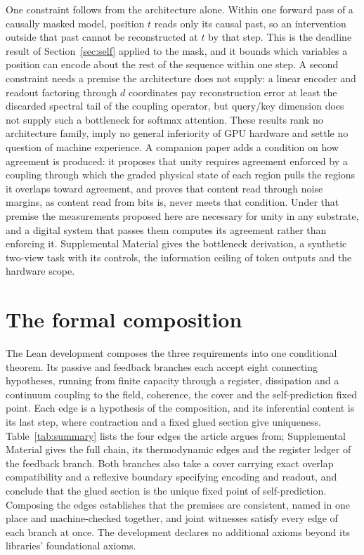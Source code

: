 \documentclass[12pt]{article}
\renewcommand{\cite}[1]{\citep{#1}}
\begin{document}
One constraint follows from the architecture alone. Within one forward pass of a causally masked model, position $t$ reads only its causal past, so an intervention outside that past cannot be reconstructed at $t$ by that step. This is the deadline result of Section~\ref{sec:self} applied to the mask, and it bounds which variables a position can encode about the rest of the sequence within one step. A second constraint needs a premise the architecture does not supply: a linear encoder and readout factoring through $d$ coordinates pay reconstruction error at least the discarded spectral tail of the coupling operator, but query/key dimension does not supply such a bottleneck for softmax attention. These results rank no architecture family, imply no general inferiority of GPU hardware and settle no question of machine experience. A companion paper \cite{bobadillasuarez2026unity} adds a condition on how agreement is produced: it proposes that unity requires agreement enforced by a coupling through which the graded physical state of each region pulls the regions it overlaps toward agreement, and proves that content read through noise margins, as content read from bits is, never meets that condition. Under that premise the measurements proposed here are necessary for unity in any substrate, and a digital system that passes them computes its agreement rather than enforcing it. Supplemental Material gives the bottleneck derivation, a synthetic two-view task with its controls, the information ceiling of token outputs and the hardware scope.

\section{The formal composition}
\label{sec:chain}

The Lean development composes the three requirements into one conditional theorem. Its passive and feedback branches each accept eight connecting hypotheses, running from finite capacity through a register, dissipation and a continuum coupling to the field, coherence, the cover and the self-prediction fixed point. Each edge is a hypothesis of the composition, and its inferential content is its last step, where contraction and a fixed glued section give uniqueness. Table~\ref{tab:summary} lists the four edges the article argues from; Supplemental Material gives the full chain, its thermodynamic edges and the register ledger of the feedback branch. Both branches also take a cover carrying exact overlap compatibility and a reflexive boundary specifying encoding and readout, and conclude that the glued section is the unique fixed point of self-prediction. Composing the edges establishes that the premises are consistent, named in one place and machine-checked together, and joint witnesses satisfy every edge of each branch at once. The development declares no additional axioms beyond its libraries' foundational axioms.
\end{document}
